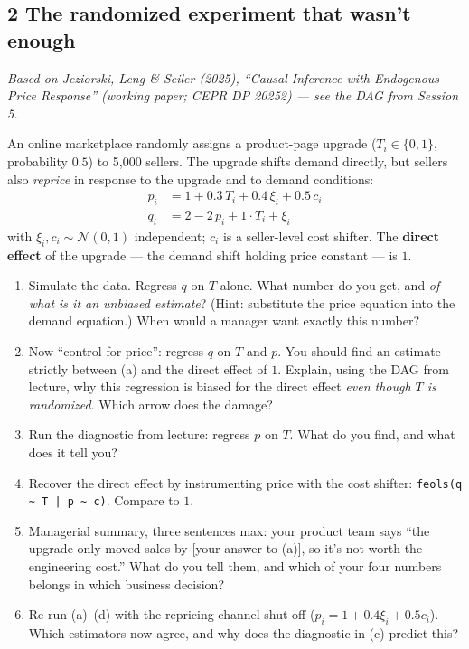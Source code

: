 \documentclass[11pt]{article}
\begin{document}
\subsection*{2 The randomized experiment that wasn't enough}

\emph{Based on Jeziorski, Leng \& Seiler (2025), ``Causal Inference with Endogenous
Price Response'' (working paper; CEPR DP 20252) --- see the DAG from Session 5.}

An online marketplace randomly assigns a product-page upgrade ($T_{i} \in \{0,1\}$,
probability $0.5$) to 5{,}000 sellers. The upgrade shifts demand directly, but sellers
also \emph{reprice} in response to the upgrade and to demand conditions:
\begin{align*}
p_{i} &= 1 + 0.3\, T_{i} + 0.4\, \xi_{i} + 0.5\, c_{i}\\
q_{i} &= 2 - 2\, p_{i} + 1 \cdot T_{i} + \xi_{i}
\end{align*}
with $\xi_{i}, c_{i} \sim \mathcal{N}(0,1)$ independent; $c_{i}$ is a seller-level
cost shifter. The \textbf{direct effect} of the upgrade --- the demand shift holding
price constant --- is $1$.
\begin{enumerate}[label=(\alph*)]
\item Simulate the data. Regress $q$ on $T$ alone. What number do you get, and
\emph{of what is it an unbiased estimate}? (Hint: substitute the price equation into
the demand equation.) When would a manager want exactly this number?
\item Now ``control for price'': regress $q$ on $T$ and $p$. You should find an
estimate strictly between (a) and the direct effect of $1$. Explain, using the DAG
from lecture, why this regression is biased for the direct effect \emph{even though
$T$ is randomized}. Which arrow does the damage?
\item Run the diagnostic from lecture: regress $p$ on $T$. What do you find, and what
does it tell you?
\item Recover the direct effect by instrumenting price with the cost shifter:
\texttt{feols(q \~{} T | p \~{} c)}. Compare to $1$.
\item Managerial summary, three sentences max: your product team says ``the upgrade
only moved sales by [your answer to (a)], so it's not worth the engineering cost.''
What do you tell them, and which of your four numbers belongs in which business
decision?
\item Re-run (a)--(d) with the repricing channel shut off ($p_{i} = 1 + 0.4\xi_{i} +
0.5c_{i}$). Which estimators now agree, and why does the diagnostic in (c) predict
this?
\end{enumerate}
\end{document}
